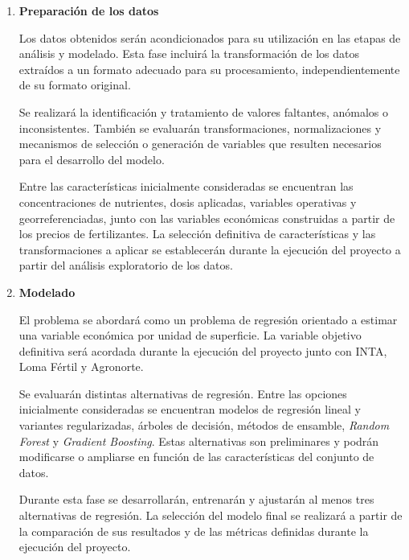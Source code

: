 \documentclass[
11pt, %
]{charter}
\begin{document}
\begin{enumerate}
  Además, se utilizará información económica proveniente de fuentes públicas y confiables, principalmente precios de fertilizantes químicos, para construir las variables necesarias para la valorización económica.

  Durante esta fase se analizarán la estructura, cantidad, calidad, consistencia y representatividad de los datos disponibles. La cantidad efectiva de registros, su formato y el nivel de detalle se determinarán una vez obtenido el acceso a la información de la plataforma de John Deere.


  \item \textbf{Preparación de los datos}

  Los datos obtenidos serán acondicionados para su utilización en las etapas de análisis y modelado. Esta fase incluirá la transformación de los datos extraídos a un formato adecuado para su procesamiento, independientemente de su formato original.

  Se realizará la identificación y tratamiento de valores faltantes, anómalos o inconsistentes. También se evaluarán transformaciones, normalizaciones y mecanismos de selección o generación de variables que resulten necesarios para el desarrollo del modelo.

  Entre las características inicialmente consideradas se encuentran las concentraciones de nutrientes, dosis aplicadas, variables operativas y georreferenciadas, junto con las variables económicas construidas a partir de los precios de fertilizantes. La selección definitiva de características y las transformaciones a aplicar se establecerán durante la ejecución del proyecto a partir del análisis exploratorio de los datos.


  \item \textbf{Modelado}

  El problema se abordará como un problema de regresión orientado a estimar una variable económica por unidad de superficie. La variable objetivo definitiva será acordada durante la ejecución del proyecto junto con INTA, Loma Fértil y Agronorte.

  Se evaluarán distintas alternativas de regresión. Entre las opciones inicialmente consideradas se encuentran modelos de regresión lineal y variantes regularizadas, árboles de decisión, métodos de ensamble, \textit{Random Forest} y \textit{Gradient Boosting}. Estas alternativas son preliminares y podrán modificarse o ampliarse en función de las características del conjunto de datos.

  Durante esta fase se desarrollarán, entrenarán y ajustarán al menos tres alternativas de regresión. La selección del modelo final se realizará a partir de la comparación de sus resultados y de las métricas definidas durante la ejecución del proyecto.



\end{enumerate}
\end{document}
